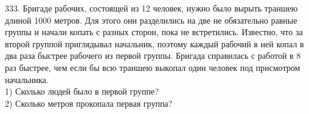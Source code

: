 333.  Бригаде рабочих, состоящей из 12 человек, нужно было вырыть траншею длиной 1000 метров.
Для этого они разделились на две не обязательно равные группы и начали копать с разных сторон,
пока не встретились. Известно, что за второй группой приглядывал начальник, поэтому каждый
рабочий в ней копал в два раза быстрее рабочего из первой группы. Бригада справилась с работой
в 8 раз быстрее, чем если бы всю траншею выкопал один человек под присмотром начальника.\\
1) Сколько людей было в первой группе?\\
2) Сколько метров прокопала первая группа?\\
